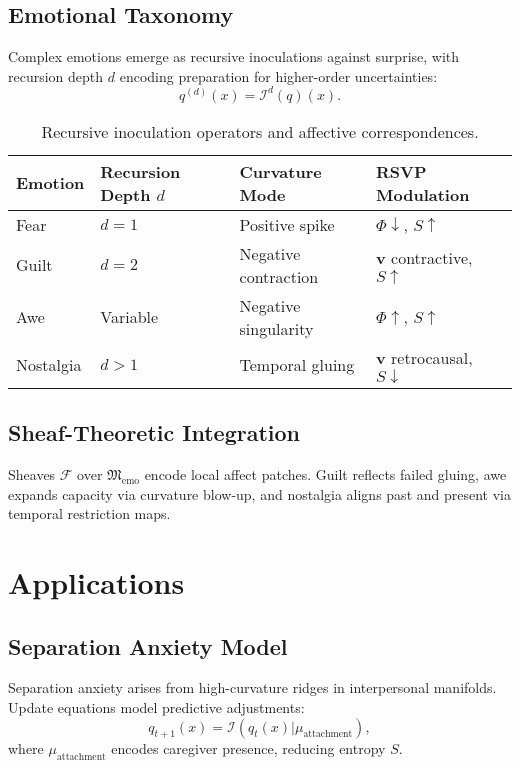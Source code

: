 \documentclass{article}
\theoremstyle{definition}
\begin{document}
\subsection{Emotional Taxonomy}
Complex emotions emerge as recursive inoculations against surprise, with recursion depth $d$ encoding preparation for higher-order uncertainties:
\[
q^{(d)}(x) = \mathcal{I}^d(q)(x).
\]
\begin{table}[ht]
\centering
\caption{Recursive inoculation operators and affective correspondences.}
\label{tab:inoculation}
\renewcommand{\arraystretch}{1.3}
\begin{tabularx}{\textwidth}{@{}l>{\centering\arraybackslash}X>{\centering\arraybackslash}X>{\centering\arraybackslash}X@{}}
\toprule
\textbf{Emotion} & \textbf{Recursion Depth $d$} & \textbf{Curvature Mode} & \textbf{RSVP Modulation} \\
\midrule
Fear & $d=1$ & Positive spike & $\Phi \downarrow$, $S \uparrow$ \\
Guilt & $d=2$ & Negative contraction & $\mathbf{v}$ contractive, $S \uparrow$ \\
Awe & Variable & Negative singularity & $\Phi \uparrow$, $S \uparrow$ \\
Nostalgia & $d>1$ & Temporal gluing & $\mathbf{v}$ retrocausal, $S \downarrow$ \\
\bottomrule
\end{tabularx}
\end{table}

\subsection{Sheaf-Theoretic Integration}
Sheaves $\mathcal{F}$ over $\mathfrak{M}_{\text{emo}}$ encode local affect patches. Guilt reflects failed gluing, awe expands capacity via curvature blow-up, and nostalgia aligns past and present via temporal restriction maps.

\section{Applications}
\subsection{Separation Anxiety Model}
Separation anxiety arises from high-curvature ridges in interpersonal manifolds. Update equations model predictive adjustments:
\[
q_{t+1}(x) = \mathcal{I}(q_t(x) | \mu_{\text{attachment}}),
\]
where $\mu_{\text{attachment}}$ encodes caregiver presence, reducing entropy $S$.
\end{document}
